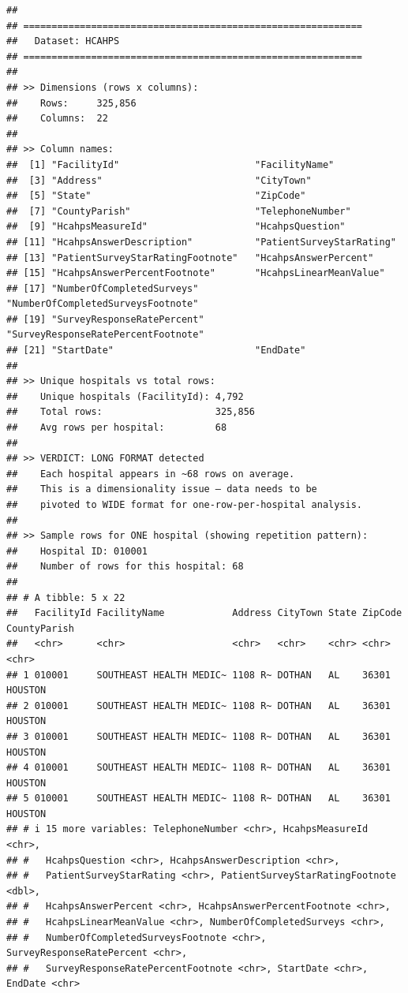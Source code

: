 \documentclass[
]{article}
\begin{document}
\begin{verbatim}
## 
## ============================================================
##   Dataset: HCAHPS 
## ============================================================
## 
## >> Dimensions (rows x columns):
##    Rows:     325,856 
##    Columns:  22 
## 
## >> Column names:
##  [1] "FacilityId"                        "FacilityName"                     
##  [3] "Address"                           "CityTown"                         
##  [5] "State"                             "ZipCode"                          
##  [7] "CountyParish"                      "TelephoneNumber"                  
##  [9] "HcahpsMeasureId"                   "HcahpsQuestion"                   
## [11] "HcahpsAnswerDescription"           "PatientSurveyStarRating"          
## [13] "PatientSurveyStarRatingFootnote"   "HcahpsAnswerPercent"              
## [15] "HcahpsAnswerPercentFootnote"       "HcahpsLinearMeanValue"            
## [17] "NumberOfCompletedSurveys"          "NumberOfCompletedSurveysFootnote" 
## [19] "SurveyResponseRatePercent"         "SurveyResponseRatePercentFootnote"
## [21] "StartDate"                         "EndDate"                          
## 
## >> Unique hospitals vs total rows:
##    Unique hospitals (FacilityId): 4,792
##    Total rows:                    325,856
##    Avg rows per hospital:         68
## 
## >> VERDICT: LONG FORMAT detected
##    Each hospital appears in ~68 rows on average.
##    This is a dimensionality issue — data needs to be
##    pivoted to WIDE format for one-row-per-hospital analysis.
## 
## >> Sample rows for ONE hospital (showing repetition pattern):
##    Hospital ID: 010001 
##    Number of rows for this hospital: 68 
## 
## # A tibble: 5 x 22
##   FacilityId FacilityName            Address CityTown State ZipCode CountyParish
##   <chr>      <chr>                   <chr>   <chr>    <chr> <chr>   <chr>       
## 1 010001     SOUTHEAST HEALTH MEDIC~ 1108 R~ DOTHAN   AL    36301   HOUSTON     
## 2 010001     SOUTHEAST HEALTH MEDIC~ 1108 R~ DOTHAN   AL    36301   HOUSTON     
## 3 010001     SOUTHEAST HEALTH MEDIC~ 1108 R~ DOTHAN   AL    36301   HOUSTON     
## 4 010001     SOUTHEAST HEALTH MEDIC~ 1108 R~ DOTHAN   AL    36301   HOUSTON     
## 5 010001     SOUTHEAST HEALTH MEDIC~ 1108 R~ DOTHAN   AL    36301   HOUSTON     
## # i 15 more variables: TelephoneNumber <chr>, HcahpsMeasureId <chr>,
## #   HcahpsQuestion <chr>, HcahpsAnswerDescription <chr>,
## #   PatientSurveyStarRating <chr>, PatientSurveyStarRatingFootnote <dbl>,
## #   HcahpsAnswerPercent <chr>, HcahpsAnswerPercentFootnote <chr>,
## #   HcahpsLinearMeanValue <chr>, NumberOfCompletedSurveys <chr>,
## #   NumberOfCompletedSurveysFootnote <chr>, SurveyResponseRatePercent <chr>,
## #   SurveyResponseRatePercentFootnote <chr>, StartDate <chr>, EndDate <chr>
\end{verbatim}
\end{document}
